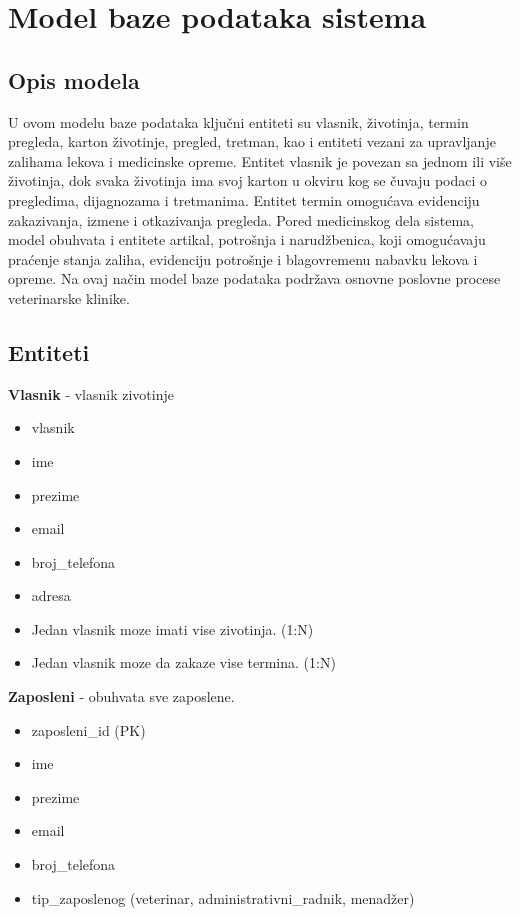 \section{Model baze podataka sistema}
\subsection{Opis modela}
\indent U ovom modelu baze podataka ključni entiteti su vlasnik, životinja, termin pregleda, karton životinje, pregled, tretman, kao i entiteti vezani za upravljanje zalihama lekova i medicinske opreme. Entitet vlasnik je povezan sa jednom ili više životinja, dok svaka životinja ima svoj karton u okviru kog se čuvaju podaci o pregledima, dijagnozama i tretmanima. Entitet termin omogućava evidenciju zakazivanja, izmene i otkazivanja pregleda. Pored medicinskog dela sistema, model obuhvata i entitete artikal, potrošnja i narudžbenica, koji omogućavaju praćenje stanja zaliha, evidenciju potrošnje i blagovremenu nabavku lekova i opreme. Na ovaj način model baze podataka podržava osnovne poslovne procese veterinarske klinike.
\subsection{Entiteti}

\indent\textbf{Vlasnik} - vlasnik zivotinje
\begin{itemize}{Atributi:}
    \item vlasnik
    \item ime
    \item prezime
    \item email
    \item broj\_telefona
    \item adresa
\end{itemize}
\begin{itemize}{Veze:}
    \item Jedan vlasnik moze imati vise zivotinja. (1:N)
    \item Jedan vlasnik moze da zakaze vise termina. (1:N)
\end{itemize}

\indent \textbf{Zaposleni} - obuhvata sve zaposlene. 
\begin{itemize}{Atributi:}
    \item zaposleni\_id (PK)
    \item ime
    \item prezime
    \item email
    \item broj\_telefona
    \item tip\_zaposlenog (veterinar, administrativni\_radnik, menadžer)
\end{itemize}


